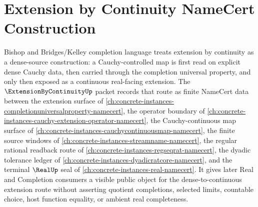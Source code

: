 \chapter{Extension by Continuity NameCert Construction}
\label{ch:concrete-instances-extension-by-continuity-namecert}

Bishop and Bridges/Kelley completion language treats extension by continuity as a dense-source construction: a Cauchy-controlled map is first read on explicit dense Cauchy data, then carried through the completion universal property, and only then exposed as a continuous real-facing extension. The $\ExtensionByContinuityUp$ packet records that route as finite NameCert data between the extension surface of \autoref{ch:concrete-instances-completionuniversalproperty-namecert}, the operator boundary of \autoref{ch:concrete-instances-cauchy-extension-operator-namecert}, the Cauchy-continuous map surface of \autoref{ch:concrete-instances-cauchycontinuousmap-namecert}, the finite source windows of \autoref{ch:concrete-instances-streamname-namecert}, the regular rational readback route of \autoref{ch:concrete-instances-regseqrat-namecert}, the dyadic tolerance ledger of \autoref{ch:concrete-instances-dyadicratcore-namecert}, and the terminal $\RealUp$ seal of \autoref{ch:concrete-instances-real-namecert}. It gives later Real and Completion consumers a visible public object for the dense-to-continuous extension route without asserting quotient completions, selected limits, countable choice, host function equality, or ambient real completeness.

